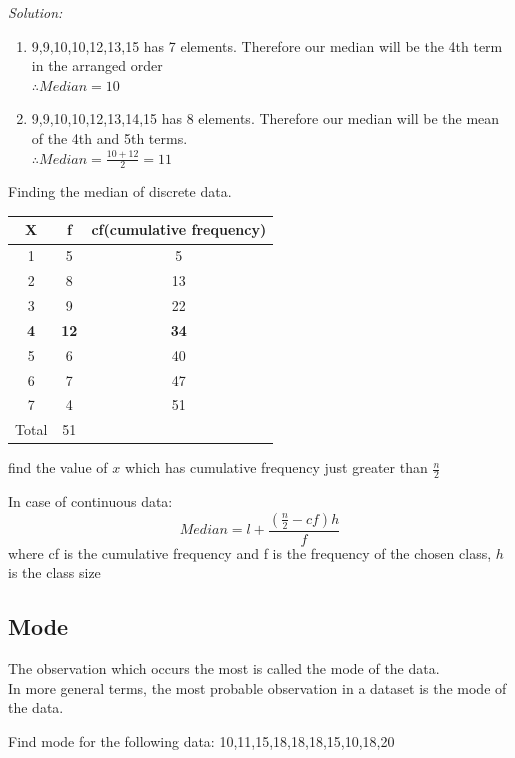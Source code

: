 \documentclass[11pt,letterpaper]{article}
\newenvironment{problem}[2][Problem]                                  
        {\begin{tcolorbox}[colback=white,colframe=gray!50,title=#1 #2]}
        {\end{tcolorbox}}
\newenvironment{solution}                      
        {\begin{mdframed}\textit{Solution:} \\}
        {\end{mdframed}}
\begin{document}
\begin{solution}
  \begin{enumerate}
    \item 9,9,10,10,12,13,15 has 7 elements. Therefore our median will be the 4th term in the arranged order\\
      $ \therefore Median = 10 $
    \item 9,9,10,10,12,13,14,15 has 8 elements. Therefore our median will be the mean of the 4th and 5th terms. \\
      $\therefore Median = \frac{10+12}{2}= 11$
  \end{enumerate}
\end{solution}

\begin{problem} 4
  Finding the median of discrete data. 
  \begin{center}
    \begin{tabular}{c|c|c}
      X & f & cf(cumulative frequency)\\
      \hline
      1 & 5 & 5\\ 
      2 & 8 & 13\\ 
      3 & 9 & 22\\ 
      \textbf{4} & \textbf{12} & \textbf{34}\\ 
      5 & 6 & 40\\ 
      6 & 7 & 47\\ 
      7 & 4 & 51\\ 
      \hline
      Total & 51 \\
    \end{tabular}
  \end{center}

  find the value of $x$ which has cumulative frequency just greater than $\frac{n}{2}$
\end{problem}

In case of continuous data:
\[
  Median = l + \frac{\left( \frac{n}{2} - cf \right)h}{f}
\]
where cf is the cumulative frequency and f is the frequency of the chosen class, $h$ is the class size

\subsection{Mode}
The observation which occurs the most is called the mode of the data. \\
In more general terms, the most probable observation in a dataset is the mode of the data. 

\begin{problem}5
  Find mode for the following data:
  10,11,15,18,18,18,15,10,18,20
\end{problem}
\end{document}
